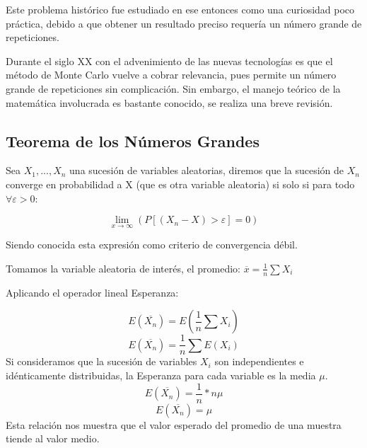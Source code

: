 \documentclass{rbf}
\begin{document}
Este problema histórico fue estudiado en ese entonces como una curiosidad poco práctica, debido a que obtener un resultado preciso requería un número grande de repeticiones. 

Durante el siglo XX con el advenimiento de las nuevas tecnologías es que el método de Monte Carlo vuelve a cobrar relevancia, pues permite un número grande de repeticiones sin complicación. Sin embargo, el manejo teórico de la matemática involucrada es bastante conocido, se realiza una breve revisión.

\subsection{Teorema de los Números Grandes}
Sea $X_1,..., X_n$ una sucesión de variables aleatorias, diremos que la sucesión de ${X_n}$ converge en probabilidad a X (que es otra variable aleatoria) si solo si para todo $\forall \varepsilon >0$:

\begin{equation}
   \displaystyle \lim_{x \to \infty}(P[(X_n - X)>\varepsilon]=0)
\end{equation}

Siendo conocida esta expresión como criterio de convergencia débil. 

Tomamos la variable aleatoria de interés, el promedio:
$\overline{x}=\frac{1}{n}\sum X_i$  

Aplicando el operador lineal Esperanza:

\begin{equation}
  \displaystyle  E(\overline{X_n})=E(\frac{1}{n} \sum X_i)
\end{equation}
\begin{equation}
    E(\overline{X_n})=\frac{1}{n} \sum E(X_i)
\end{equation}
Si consideramos que la sucesión de variables $X_i$ son independientes e idénticamente distribuidas, la Esperanza para cada variable es la media $\mu$.
\begin{equation}
    E(\overline{X_n})=\frac{1}{n} *n\mu
\end{equation}
\begin{equation}
    E(\overline{X_n})=\mu
\end{equation}
Esta relación nos muestra que el valor esperado del promedio de una muestra tiende al valor medio.
\end{document}
